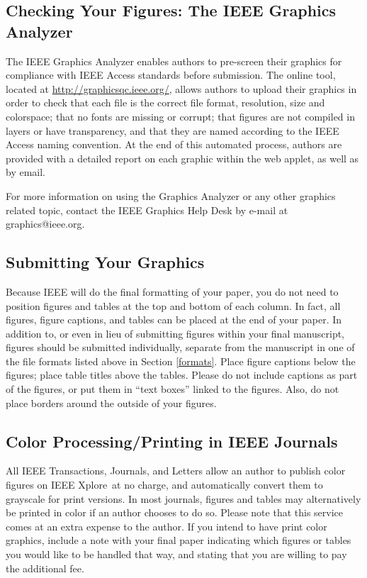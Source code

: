 \documentclass{ieeeaccess}
\begin{document}
\subsection{Checking Your Figures: The IEEE Graphics Analyzer}
The IEEE Graphics Analyzer enables authors to pre-screen their graphics for
compliance with IEEE Access standards before submission.
The online tool, located at
\underline{http://graphicsqc.ieee.org/}, allows authors to
upload their graphics in order to check that each file is the correct file
format, resolution, size and colorspace; that no fonts are missing or
corrupt; that figures are not compiled in layers or have transparency, and
that they are named according to the IEEE Access naming
convention. At the end of this automated process, authors are provided with
a detailed report on each graphic within the web applet, as well as by
email.

For more information on using the Graphics Analyzer or any other graphics
related topic, contact the IEEE Graphics Help Desk by e-mail at
graphics@ieee.org.

\subsection{Submitting Your Graphics}
Because IEEE will do the final formatting of your paper,
you do not need to position figures and tables at the top and bottom of each
column. In fact, all figures, figure captions, and tables can be placed at
the end of your paper. In addition to, or even in lieu of submitting figures
within your final manuscript, figures should be submitted individually,
separate from the manuscript in one of the file formats listed above in
Section \ref{formats}. Place figure captions below the figures; place table titles
above the tables. Please do not include captions as part of the figures, or
put them in ``text boxes'' linked to the figures. Also, do not place borders
around the outside of your figures.

\subsection{Color Processing/Printing in IEEE Journals}
All IEEE Transactions, Journals, and Letters allow an author to publish
color figures on IEEE Xplore\textregistered\ at no charge, and automatically
convert them to grayscale for print versions. In most journals, figures and
tables may alternatively be printed in color if an author chooses to do so.
Please note that this service comes at an extra expense to the author. If
you intend to have print color graphics, include a note with your final
paper indicating which figures or tables you would like to be handled that
way, and stating that you are willing to pay the additional fee.
\end{document}
